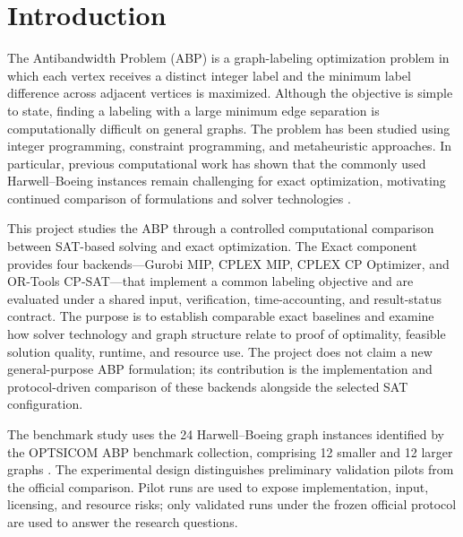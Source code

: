 
\section{Introduction}
\label{sec:introduction}

The Antibandwidth Problem (ABP) is a graph-labeling optimization problem in which each vertex receives a distinct integer label and the minimum label difference across adjacent vertices is maximized. Although the objective is simple to state, finding a labeling with a large minimum edge separation is computationally difficult on general graphs. The problem has been studied using integer programming, constraint programming, and metaheuristic approaches. In particular, previous computational work has shown that the commonly used Harwell--Boeing instances remain challenging for exact optimization, motivating continued comparison of formulations and solver technologies \citep{Duarte2011,Sinnl2021}.

This project studies the ABP through a controlled computational comparison between SAT-based solving and exact optimization. The Exact component provides four backends---Gurobi MIP, CPLEX MIP, CPLEX CP Optimizer, and OR-Tools CP-SAT---that implement a common labeling objective and are evaluated under a shared input, verification, time-accounting, and result-status contract. The purpose is to establish comparable exact baselines and examine how solver technology and graph structure relate to proof of optimality, feasible solution quality, runtime, and resource use. The project does not claim a new general-purpose ABP formulation; its contribution is the implementation and protocol-driven comparison of these backends alongside the selected SAT configuration.

The benchmark study uses the 24 Harwell--Boeing graph instances identified by the OPTSICOM ABP benchmark collection, comprising 12 smaller and 12 larger graphs \citep{OptsicomABP}. The experimental design distinguishes preliminary validation pilots from the official comparison. Pilot runs are used to expose implementation, input, licensing, and resource risks; only validated runs under the frozen official protocol are used to answer the research questions.


